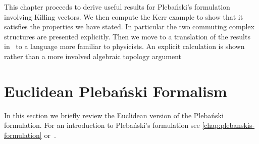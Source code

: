 \documentclass[10pt]{report}
\newcommand{\pleb}[0]{Pleba\'nski}
\theoremstyle{definition}
\begin{document}
This chapter proceeds to derive useful results for \pleb{}'s formulation involving Killing vectors. We then compute the Kerr example to show that it satisfies the properties we have stated. In particular the two commuting complex structures are presented explicitly. Then we move to a translation of the results in~\cite{AmbitoricGeomeAposto2013} to a language more familiar to physicists. An explicit calculation is shown rather than a more involved algebraic topology argument

\section{Euclidean \pleb{} Formalism}\label{sec:type-D-euclidea-plebanski-formalism}
In this section we briefly review the Euclidean version of the \pleb{} formulation. For an introduction to \pleb{}'s formulation see \cref{chap:plebanskis-formulation} or~\cite{PlebanskiFormuKrasno2009,FormGenRelGravity2020}.
\end{document}
